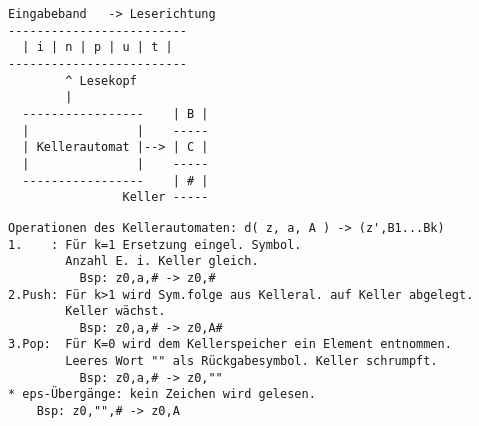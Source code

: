\documentclass[11pt,
			a4paper,
			parskip=full,
			toc=bib,
			toc=idx,
			toc=listof,
			ngerman
			listof=totoc,]{scrartcl}
\newenvironment{expl}%
{\color{red}}
{\color{black}}
\newcommand{\compress}{\vspace{-1em}}
\begin{document}
\compress
\compress
\begin{expl}
\begin{minipage}[t]{1\linewidth}
  \begin{minipage}[t]{0.35\linewidth}
    \begin{verbatim}
Eingabeband   -> Leserichtung
-------------------------
  | i | n | p | u | t |   
-------------------------  
        ^ Lesekopf          
        |                
  -----------------    | B |
  |               |    -----
  | Kellerautomat |--> | C |
  |               |    -----
  -----------------    | # |
                Keller -----  
    \end{verbatim}
  \end{minipage}
  \begin{minipage}[t]{0.65\linewidth}
    \begin{verbatim}
Operationen des Kellerautomaten: d( z, a, A ) -> (z',B1...Bk)
1.    : Für k=1 Ersetzung eingel. Symbol. 
        Anzahl E. i. Keller gleich.
          Bsp: z0,a,# -> z0,#
2.Push: Für k>1 wird Sym.folge aus Kelleral. auf Keller abgelegt.
        Keller wächst.
          Bsp: z0,a,# -> z0,A#
3.Pop:  Für K=0 wird dem Kellerspeicher ein Element entnommen.
        Leeres Wort "" als Rückgabesymbol. Keller schrumpft.
          Bsp: z0,a,# -> z0,""
* eps-Übergänge: kein Zeichen wird gelesen.
    Bsp: z0,"",# -> z0,A 
    \end{verbatim}
  \end{minipage}
\end{minipage}
\end{expl}
\end{document}

